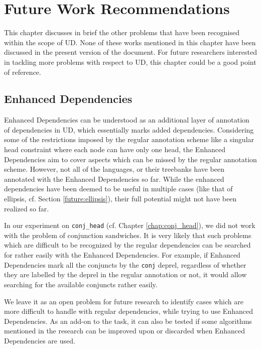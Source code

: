 \chapter{Future Work Recommendations}
\label{chap:future}

This chapter discusses in brief the other problems that have been recognised within the scope of UD. None of these works mentioned in this chapter have been discussed in the present version of the document. For future researchers interested in tackling more problems with respect to UD, this chapter could be a good point of reference. 

\section{Enhanced Dependencies}
\label{future:enhanced}

Enhanced Dependencies can be understood as an additional layer of annotation of dependencies in UD, which essentially marks added dependencies. Considering some of the restrictions imposed by the regular annotation scheme like a singular head constraint where each node can have only one head, the Enhanced Dependencies aim to cover aspects which can be missed by the regular annotation scheme. However, not all of the languages, or their treebanks have been annotated with the Enhanced Dependencies so far. While the enhanced dependencies have been deemed to be useful in multiple cases (like that of ellipsis, cf. Section \ref{future:ellipsis}), their full potential might not have been realized so far.

In our experiment on \verb|conj_head| (cf. Chapter \ref{chap:conj_head}), we did not work with the problem of conjunction sandwiches. It is very likely that such problems which are difficult to be recognized by the regular dependencies can be searched for rather easily with the Enhanced Dependencies. For example, if Enhanced Dependencies mark all the conjuncts by the \texttt{conj} deprel, regardless of whether they are labelled by the deprel in the regular annotation or not, it would allow searching for the available conjuncts rather easily.

We leave it as an open problem for future research to identify cases which are more difficult to handle with regular dependencies, while trying to use Enhanced Dependencies. As an add-on to the task, it can also be tested if some algorithms mentioned in the research can be improved upon or discarded when Enhanced Dependencies are used.


